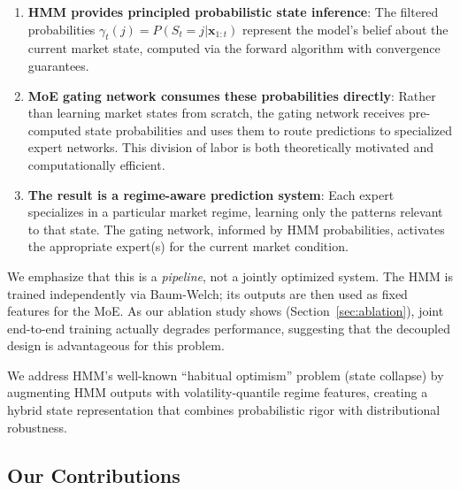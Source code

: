\documentclass[3p,times]{elsarticle}
\begin{document}
\begin{enumerate}
\item \textbf{HMM provides principled probabilistic state inference}: The filtered probabilities $\gamma_t(j) = P(S_t = j | \mathbf{x}_{1:t})$ represent the model's belief about the current market state, computed via the forward algorithm with convergence guarantees.

\item \textbf{MoE gating network consumes these probabilities directly}: Rather than learning market states from scratch, the gating network receives pre-computed state probabilities and uses them to route predictions to specialized expert networks. This division of labor is both theoretically motivated and computationally efficient.

\item \textbf{The result is a regime-aware prediction system}: Each expert specializes in a particular market regime, learning only the patterns relevant to that state. The gating network, informed by HMM probabilities, activates the appropriate expert(s) for the current market condition.
\end{enumerate}

We emphasize that this is a \textit{pipeline}, not a jointly optimized system. The HMM is trained independently via Baum-Welch; its outputs are then used as fixed features for the MoE. As our ablation study shows (Section~\ref{sec:ablation}), joint end-to-end training actually degrades performance, suggesting that the decoupled design is advantageous for this problem.

We address HMM's well-known ``habitual optimism'' problem (state collapse) by augmenting HMM outputs with volatility-quantile regime features, creating a hybrid state representation that combines probabilistic rigor with distributional robustness.

\subsection{Our Contributions}
\label{sec:intro:contrib}
\end{document}
